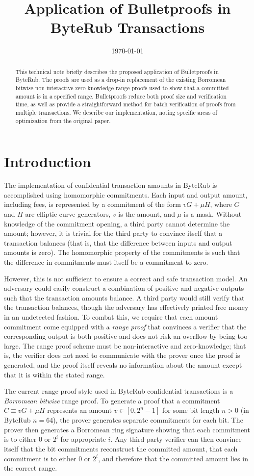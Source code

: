 \documentclass{mrl}
\title{Application of Bulletproofs in ByteRub Transactions}
\date{\today}
\begin{document}
\begin{abstract}
This technical note briefly describes the proposed application of Bulletproofs \cite{bp} in ByteRub. The proofs are used as a drop-in replacement of the existing Borromean bitwise non-interactive zero-knowledge range proofs used to show that a committed amount is in a specified range. Bulletproofs reduce both proof size and verification time, as well as provide a straightforward method for batch verification of proofs from multiple transactions. We describe our implementation, noting specific areas of optimization from the original paper.
\end{abstract}

\section{Introduction}
The implementation of confidential transaction amounts in ByteRub is accomplished using homomorphic commitments. Each input and output amount, including fees, is represented by a commitment of the form $vG + \mu H$, where $G$ and $H$ are elliptic curve generators, $v$ is the amount, and $\mu$ is a mask. Without knowledge of the commitment opening, a third party cannot determine the amount; however, it is trivial for the third party to convince itself that a transaction balances (that is, that the difference between inputs and output amounts is zero). The homomorphic property of the commitments is such that the difference in commitments must itself be a commitment to zero.

However, this is not sufficient to ensure a correct and safe transaction model. An adversary could easily construct a combination of positive and negative outputs such that the transaction amounts balance. A third party would still verify that the transaction balances, though the adversary has effectively printed free money in an undetected fashion. To combat this, we require that each amount commitment come equipped with a \textit{range proof} that convinces a verifier that the corresponding output is both positive and does not risk an overflow by being too large. The range proof scheme must be non-interactive and zero-knowledge; that is, the verifier does not need to communicate with the prover once the proof is generated, and the proof itself reveals no information about the amount except that it is within the stated range.

The current range proof style used in ByteRub confidential transactions is a \textit{Borromean bitwise} range proof. To generate a proof that a commitment $C \equiv vG + \mu H$ represents an amount $v \in [0,2^n-1]$ for some bit length $n > 0$ (in ByteRub $n = 64$), the prover generates separate commitments for each bit. The prover then generates a Borromean ring signature showing that each commitment is to either $0$ or $2^i$ for appropriate $i$. Any third-party verifier can then convince itself that the bit commitments reconstruct the committed amount, that each commitment is to either $0$ or $2^i$, and therefore that the committed amount lies in the correct range.
\end{document}
